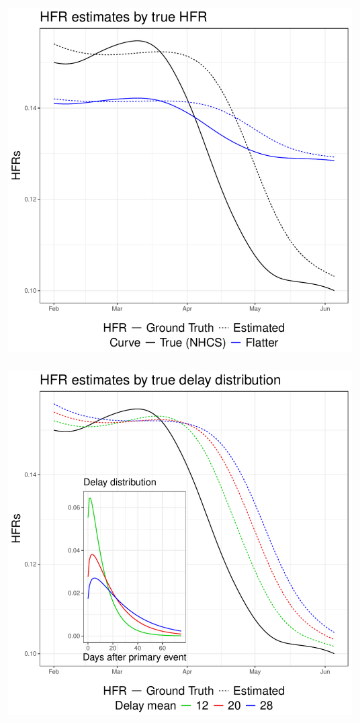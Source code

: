 \documentclass{article}
\begin{document}
\begin{figure}
     \centering
     \begin{subfigure}[b]{0.32\linewidth}
         \centering
         \includegraphics[width=\linewidth]{Figures/Simulated/toy_chging_hfr.pdf}
         \caption{}
         \label{fig:toy_hfr}
     \end{subfigure}
     \begin{subfigure}[b]{0.32\linewidth}
         \centering
         \includegraphics[width=\linewidth]{Figures/Simulated/toy_delay_distr.pdf}

\end{subfigure}
\end{figure}
\end{document}
